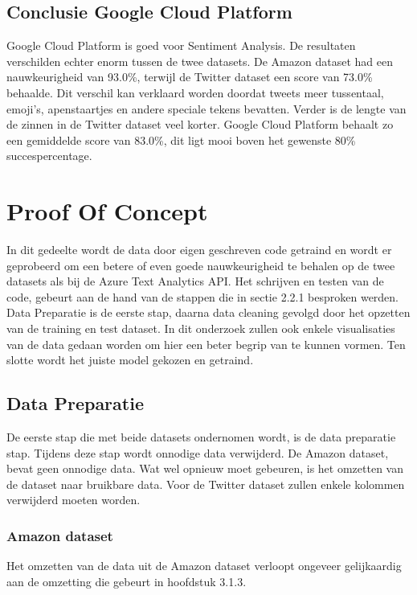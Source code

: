 \subsection{Conclusie Google Cloud Platform}
\label{conclusieGoogleCloudPlatform}

Google Cloud Platform is goed voor Sentiment Analysis. De resultaten verschilden echter enorm tussen de twee datasets. De Amazon dataset had een nauwkeurigheid van 93.0\%, terwijl de Twitter dataset een score van 73.0\% behaalde. Dit verschil kan verklaard worden doordat tweets meer tussentaal, emoji's, apenstaartjes en andere speciale tekens bevatten. Verder is de lengte van de zinnen in de Twitter dataset veel korter. Google Cloud Platform behaalt zo een gemiddelde score van 83.0\%, dit ligt mooi boven het gewenste 80\% succespercentage.


\section{Proof Of Concept}

In dit gedeelte wordt de data door eigen geschreven code getraind en wordt er geprobeerd om een betere of even goede nauwkeurigheid te behalen op de twee datasets als bij de Azure Text Analytics API. Het schrijven en testen van de code, gebeurt aan de hand van de stappen die in sectie 2.2.1 besproken werden. Data Preparatie is de eerste stap, daarna data cleaning gevolgd door het opzetten van de training en test dataset. In dit onderzoek zullen ook enkele visualisaties van de data gedaan worden om hier een beter begrip van te kunnen vormen. Ten slotte wordt het juiste model gekozen en getraind. 

\subsection{Data Preparatie}
\label{proofofconceptdatapreparatie}
De eerste stap die met beide datasets ondernomen wordt, is de data preparatie stap. Tijdens deze stap wordt onnodige data verwijderd. De Amazon dataset, bevat geen onnodige data. Wat wel opnieuw moet gebeuren, is het omzetten van de dataset naar bruikbare data. Voor de Twitter dataset zullen enkele kolommen verwijderd moeten worden.

\subsubsection{Amazon dataset}
Het omzetten van de data uit de Amazon dataset verloopt ongeveer gelijkaardig aan de omzetting die gebeurt in hoofdstuk 3.1.3.
 
